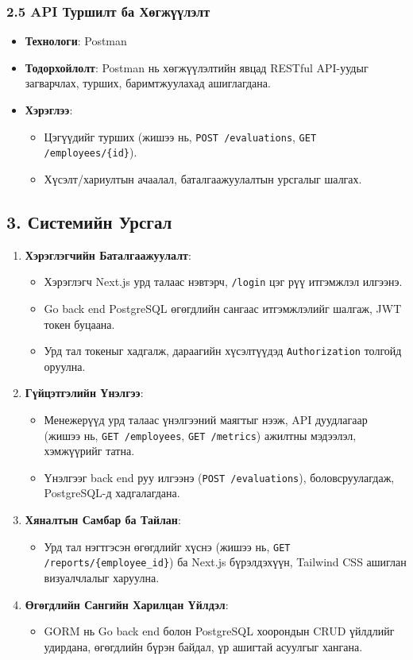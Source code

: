 \subsubsection*{2.5 API Туршилт ба Хөгжүүлэлт}
\begin{itemize}
    \item \textbf{Технологи}: Postman
    \item \textbf{Тодорхойлолт}: Postman нь хөгжүүлэлтийн явцад RESTful API-уудыг загварчлах, турших, баримтжуулахад ашиглагдана.
    \item \textbf{Хэрэглээ}:
    \begin{itemize}
        \item Цэгүүдийг турших (жишээ нь, \texttt{POST /evaluations}, \texttt{GET /employees/\{id\}}).
        \item Хүсэлт/хариултын ачаалал, баталгаажуулалтын урсгалыг шалгах.
    \end{itemize}
\end{itemize}

\subsection*{3. Системийн Урсгал}
\begin{enumerate}
    \item \textbf{Хэрэглэгчийн Баталгаажуулалт}:
    \begin{itemize}
        \item Хэрэглэгч Next.js урд талаас нэвтэрч, \texttt{/login} цэг рүү итгэмжлэл илгээнэ.
        \item Go back end PostgreSQL өгөгдлийн сангаас итгэмжлэлийг шалгаж, JWT токен буцаана.
        \item Урд тал токеныг хадгалж, дараагийн хүсэлтүүдэд \texttt{Authorization} толгойд оруулна.
    \end{itemize}
    \item \textbf{Гүйцэтгэлийн Үнэлгээ}:
    \begin{itemize}
        \item Менежерүүд урд талаас үнэлгээний маягтыг нээж, API дуудлагаар (жишээ нь, \texttt{GET /employees}, \texttt{GET /metrics}) ажилтны мэдээлэл, хэмжүүрийг татна.
        \item Үнэлгээг back end руу илгээнэ (\texttt{POST /evaluations}), боловсруулагдаж, PostgreSQL-д хадгалагдана.
    \end{itemize}
    \item \textbf{Хяналтын Самбар ба Тайлан}:
    \begin{itemize}
        \item Урд тал нэгтгэсэн өгөгдлийг хүснэ (жишээ нь, \texttt{GET /reports/\{employee\_id\}}) ба Next.js бүрэлдэхүүн, Tailwind CSS ашиглан визуалчлалыг харуулна.
    \end{itemize}
    \item \textbf{Өгөгдлийн Сангийн Харилцан Үйлдэл}:
    \begin{itemize}
        \item GORM нь Go back end болон PostgreSQL хоорондын CRUD үйлдлийг удирдана, өгөгдлийн бүрэн байдал, үр ашигтай асуулгыг хангана.
    \end{itemize}
\end{enumerate}

